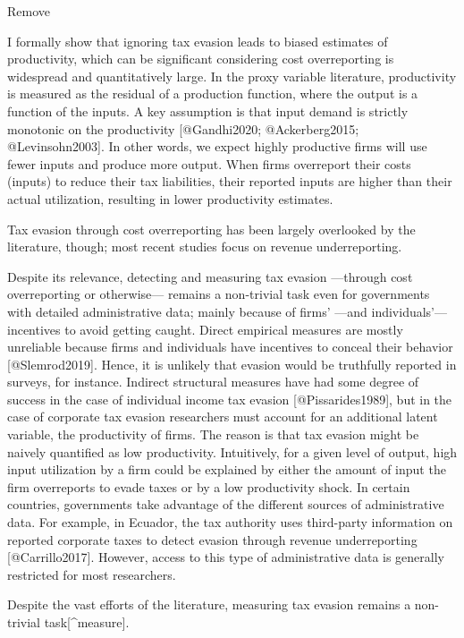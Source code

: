 \documentclass[
  12pt]{article}
\theoremstyle{definition}
\theoremstyle{remark}
\begin{document}
\begin{anfxnote*}{Remove}

I formally show that ignoring tax evasion leads to biased estimates of productivity, which can be significant considering cost overreporting is widespread and quantitatively large. In the proxy variable literature, productivity is measured as the residual of a production function, where the output is a function of the inputs. A key assumption is that input demand is strictly monotonic on the productivity [@Gandhi2020; @Ackerberg2015; @Levinsohn2003]. In other words, we expect highly productive firms will use fewer inputs and produce more output. When firms overreport their costs (inputs) to reduce their tax liabilities, their reported inputs are higher than their actual utilization, resulting in lower productivity estimates.

Tax evasion through cost overreporting has been largely overlooked by the literature, though; most recent studies focus on revenue underreporting.

Despite its relevance, detecting and measuring tax evasion —through cost overreporting or otherwise— remains a non-trivial task even for governments with detailed administrative data; mainly because of firms' —and individuals'— incentives to avoid getting caught. Direct empirical measures are mostly unreliable because firms and individuals have incentives to conceal their behavior [@Slemrod2019]. Hence, it is unlikely that evasion would be truthfully reported in surveys, for instance. Indirect structural measures have had some degree of success in the case of individual income tax evasion [@Pissarides1989], but in the case of corporate tax evasion researchers must account for an additional latent variable, the productivity of firms. The reason is that tax evasion might be naively quantified as low productivity. Intuitively, for a given level of output, high input utilization by a firm could be explained by either the amount of input the firm overreports to evade taxes or by a low productivity shock. In certain countries, governments take advantage of the different sources of administrative data. For example, in Ecuador, the tax authority uses third-party information on reported corporate taxes to detect evasion through revenue underreporting [@Carrillo2017]. However, access to this type of administrative data is generally restricted for most researchers.

Despite the vast efforts of the literature, measuring tax evasion remains a non-trivial task[^measure].


\end{anfxnote*}
\end{document}
